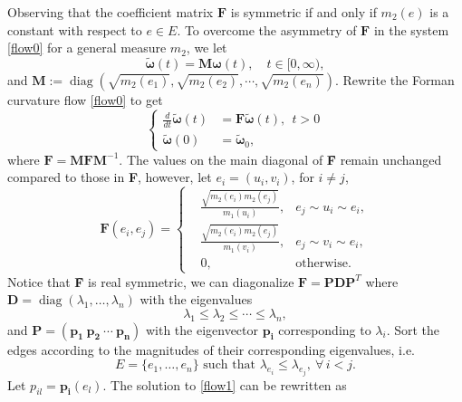 \documentclass{article}
\begin{document}
Observing that the coefficient matrix $\mathbf{F}$ is symmetric if and only if $m_2(e)$ is a constant with respect to $e\in E$.
To overcome the asymmetry of  $\mathbf{F}$ in the system \eqref{flow0} for a general measure $m_2$, we let 
\begin{equation}\label{relation}
\bm{\tilde{\omega}}(t)=\mathbf{M} \bm\omega(t),\quad t\in[0,\infty),
\end{equation}
and $\mathbf{M}:=\operatorname{diag}(\sqrt{m_2(e_1)},\sqrt{m_2(e_2)},\cdots,\sqrt{m_2(e_n)})$.
Rewrite the Forman curvature flow \eqref{flow0} to get 
\begin{equation}\label{flow1}
\left\{\begin{aligned}
   \frac{d}{dt} \bm{\tilde{\omega}}(t)&=\textbf{\~{F}}\bm{\tilde{\omega}}(t),~~ t>0\\
    \bm{\tilde{\omega}}(0)&=\bm{\tilde{\omega}}_0,
\end{aligned}
  \right.
  \end{equation}
 where \(\textbf{\~{F}}=\mathbf{M} \mathbf{F}\mathbf{M}^{-1}.\)
 The values on the main diagonal of \textbf{\~{F}} remain unchanged compared to those in \textbf{F}, however, let $e_i=(u_i,v_i)$, for $i\neq j$,
\[\textbf{\~F}(e_i,e_j)=\left\{\begin{aligned}
   &\frac{\sqrt{m_2(e_i)m_2(e_j)}}{m_1(u_i)},& e_j\sim u_i\sim e_i,\\
   &\frac{\sqrt{m_2(e_i)m_2(e_j)}}{m_1(v_i)},& e_j\sim v_i\sim e_i,\\
   &0,&\mbox{otherwise.}
\end{aligned}
  \right.\] 
Notice that \textbf{\~{F}} is real  symmetric, we can diagonalize  $\textbf{\~{F}} = \mathbf{P} \mathbf{D} \mathbf{P}^{T}$ where $\mathbf{D} = \operatorname{diag}(\lambda_1, \dots,\lambda_{n})$ with the eigenvalues
\[\lambda_1\leq \lambda_2\leq \cdots\leq \lambda_n,\]
and $\mathbf{P}=(\mathbf{p_1}~\mathbf{p_2}~\cdots~\mathbf{p_{n}})$ with the eigenvector $\mathbf{p_i}$ corresponding to $\lambda_i$. Sort the edges according to the magnitudes of their corresponding eigenvalues, i.e.
\[E = \{ e_1, \dots, e_n \} \text{ such that } \lambda_{e_i}\leq \lambda_{e_j},\ \forall \, i < j.\]
Let $p_{il}=\mathbf{p_i}(e_l).$
The solution to \eqref{flow1} can be rewritten as
\end{document}
